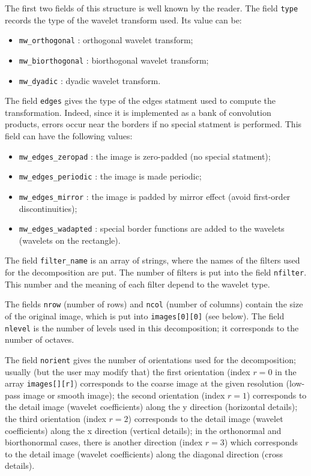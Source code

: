 The first two fields of this structure is well known by the reader.
The field \verb+type+ records the type of the wavelet transform used.
Its value can be:
\begin{itemize}
\item \verb+mw_orthogonal+ : orthogonal wavelet transform;
\item \verb+mw_biorthogonal+ : biorthogonal wavelet transform;
\item \verb+mw_dyadic+ : dyadic wavelet transform.
\end{itemize}

The field \verb+edges+ gives the type of the edges statment used to compute
the transformation. Indeed, since it is implemented as a bank of convolution
products, errors occur near the borders if no special statment is performed.
This field can have the following values:
\begin{itemize}
\item \verb+mw_edges_zeropad+ : the image is zero-padded (no special statment);
\item \verb+mw_edges_periodic+ : the image is made periodic;
\item \verb+mw_edges_mirror+ : the image is padded by mirror effect (avoid first-order discontinuities);
\item \verb+mw_edges_wadapted+ : special border functions are added to the wavelets (wavelets on the rectangle).
\end{itemize}

The field \verb+filter_name+ is an array of strings, where the names of the filters used for the decomposition are put. 
The number of filters is put into the field \verb+nfilter+.
This number and the meaning of each filter depend to the wavelet type.

The fields \verb+nrow+ (number of rows) and \verb+ncol+ (number of columns) contain the size of the original image, which is put into \verb+images[0][0]+ (see below).
The field \verb+nlevel+ is the number of levels used in this decomposition; it corresponds to the number of octaves.

The field \verb+norient+ gives the number of orientations used for the decomposition;
usually (but the user may modify that) the first orientation (index $r=0$ in the array \verb+images[][r]+) corresponds to the coarse image at the given resolution (low-pass image or smooth image);
the second orientation (index $r=1$) corresponds to the detail image (wavelet coefficients) along the y direction (horizontal details);
the third orientation (index $r=2$) corresponds to the detail image (wavelet coefficients) along the x direction (vertical details);
in the orthonormal and biorthonormal cases, there is another direction (index $r=3$) which corresponds to the detail image (wavelet coefficients) along the diagonal direction (cross details).

